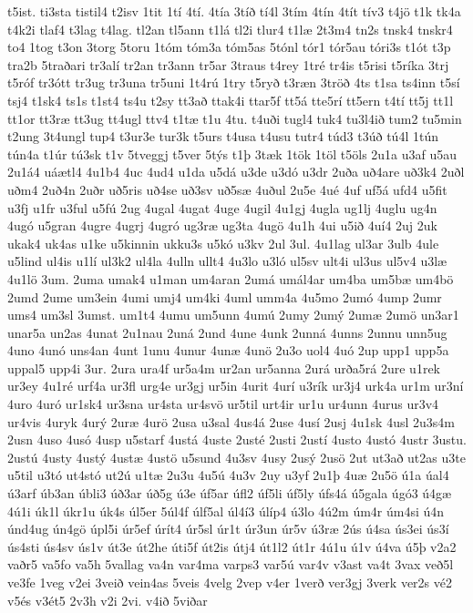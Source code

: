 {t5ist.
ti3sta
tistil4
t2isv
1tit
1tí
4tí.
4tía
3tíð
tí4l
3tím
4tín
4tít
tív3
t4jö
t1k
tk4a
t4k2i
tlaf4
t3lag
t4lag.
tl2an
tl5ann
t1lá
tl2i
tlur4
t1læ
2t3m4
tn2s
tnsk4
tnskr4
to4
1tog
t3on
3torg
5toru
1tóm
tóm3a
tóm5as
5tónl
tór1
tór5au
tóri3s
t1ót
t3p
tra2b
5traðari
tr3alí
tr2an
tr3ann
tr5ar
3traus
t4rey
1tré
tr4is
t5risi
t5ríka
3trj
t5róf
tr3ótt
tr3ug
tr3una
tr5uni
1t4rú
1try
t5ryð
t3ræn
3tröð
4ts
t1sa
ts4inn
t5sí
tsj4
t1sk4
ts1s
t1st4
ts4u
t2sy
tt3að
ttak4i
ttar5f
tt5á
tte5rí
tt5ern
t4tí
tt5j
tt1l
tt1or
tt3ræ
tt3ug
tt4ugl
ttv4
t1tæ
t1u
4tu.
t4uði
tugl4
tuk4
tu3l4ið
tum2
tu5min
t2ung
3t4ungl
tup4
t3ur3e
tur3k
t5urs
t4usa
t4usu
tutr4
túd3
t3úð
tú4l
1tún
tún4a
t1úr
tú3sk
t1v
5tveggj
t5ver
5týs
t1þ
3tæk
1tök
1töl
t5öls
2u1a
u3af
u5au
2u1á4
uáætl4
4u1b4
4uc
4ud4
u1da
u5dá
u3de
u3dó
u3dr
2uða
uð4are
uð3k4
2uðl
uðm4
2uð4n
2uðr
uð5ris
uð4se
uð3sv
uð5sæ
4uðul
2u5e
4ué
4uf
uf5á
ufd4
u5fit
u3fj
u1fr
u3ful
u5fú
2ug
4ugal
4ugat
4uge
4ugil
4u1gj
4ugla
ug1lj
4uglu
ug4n
4ugó
u5gran
4ugre
4ugrj
4ugró
ug3ræ
ug3ta
4ugö
4u1h
4ui
u5ið
4uí4
2uj
2uk
ukak4
uk4as
u1ke
u5kinnin
ukku3s
u5kó
u3kv
2ul
3ul.
4u1lag
ul3ar
3ulb
4ule
u5lind
ul4is
u1lí
ul3k2
ul4la
4ulln
ullt4
4u3lo
u3ló
ul5sv
ult4i
ul3us
ul5v4
u3læ
4u1lö
3um.
2uma
umak4
u1man
um4aran
2umá
umál4ar
um4ba
um5bæ
um4bö
2umd
2ume
um3ein
4umi
umj4
um4ki
4uml
umm4a
4u5mo
2umó
4ump
2umr
ums4
um3sl
3umst.
um1t4
4umu
um5unn
4umú
2umy
2umý
2umæ
2umö
un3ar1
unar5a
un2as
4unat
2u1nau
2uná
2und
4une
4unk
2unná
4unns
2unnu
unn5ug
4uno
4unó
uns4an
4unt
1unu
4unur
4unæ
4unö
2u3o
uol4
4uó
2up
upp1
upp5a
uppal5
upp4i
3ur.
2ura
ura4f
ur5a4m
ur2an
ur5anna
2urá
urða5rá
2ure
u1rek
ur3ey
4u1ré
urf4a
ur3fl
urg4e
ur3gj
ur5in
4urit
4urí
u3rík
ur3j4
urk4a
ur1m
ur3ní
4uro
4uró
ur1sk4
ur3sna
ur4sta
ur4svö
ur5til
urt4ir
ur1u
ur4unn
4urus
ur3v4
ur4vis
4uryk
4urý
2uræ
4urö
2usa
u3sal
4us4á
2use
4usí
2usj
4u1sk
4usl
2u3s4m
2usn
4uso
4usó
4usp
u5starf
4ustá
4uste
2usté
2usti
2ustí
4usto
4ustó
4ustr
3ustu.
2ustú
4usty
4ustý
4ustæ
4ustö
u5sund
4u3sv
4usy
2usý
2usö
2ut
ut3að
ut2as
u3te
u5til
u3tó
ut4stó
ut2ú
u1tæ
2u3u
4u5ú
4u3v
2uy
u3yf
2u1þ
4uæ
2u5ö
ú1a
úal4
ú3arf
úb3an
úbli3
úð3ar
úð5g
ú3e
úf5ar
úfl2
úf5li
úf5ly
úfs4á
ú5gala
úgó3
ú4gæ
4ú1i
úk1l
úkr1u
úk4s
úl5er
5úl4f
úlf5al
úl4í3
úlíp4
ú3lo
4ú2m
úm4r
úm4si
ú4n
únd4ug
ún4gö
úpl5i
úr5ef
úrít4
úr5sl
úr1t
úr3un
úr5v
ú3ræ
2ús
ú4sa
ús3ei
ús3í
ús4sti
ús4sv
ús1v
út3e
út2he
úti5f
út2is
útj4
út1l2
út1r
4ú1u
ú1v
ú4va
ú5þ
v2a2
vaðr5
va5fo
va5h
5vallag
va4n
var4ma
varps3
var5ú
var4v
v3ast
va4t
3vax
veð5l
ve3fe
1veg
v2ei
3veið
vein4as
5veis
4velg
2vep
v4er
1verð
ver3gj
3verk
ver2s
vé2
v5és
v3ét5
2v3h
v2i
2vi.
v4ið
5viðar
}
